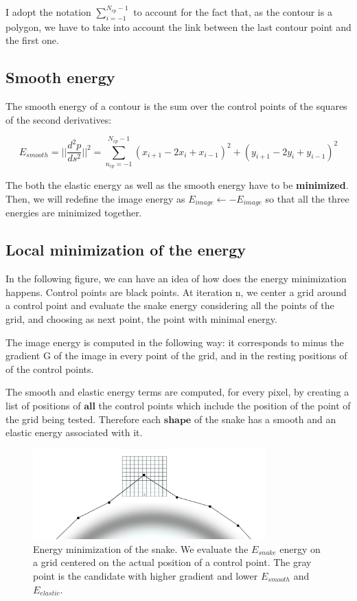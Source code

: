 \documentclass[24pt]{article}
\begin{document}
I adopt the notation $\sum_{i = -1}^{N_{cp}-1} $ to account for the fact that, as the contour is a polygon, we have to take into account the link between the last contour point and the first one. 

\subsection{Smooth energy} 

 The smooth energy of a contour is the sum over the control points of the squares of the second derivatives:
   
   $$E_{smooth} = || \frac{d^2p}{ds^2}||^2  = \sum_{n_{cp} = -1}^{N_{cp}-1} (x_{i+1} - 2 x_{i} + x_{i-1})^2 + (y_{i+1} - 2 y_{i} + y_{i-1})^2   $$   

The both the elastic energy as well as the smooth energy have to be \textbf{minimized}. Then, we will redefine the image energy as $E_{image} \leftarrow -E_{image}$ so that all the three energies are minimized together. 

\subsection{Local minimization of the energy} 

In the following figure, we can have an idea of how does the energy minimization happens. Control points are black points. At iteration n, we center a grid around a control point and evaluate the snake energy considering all the points of the grid, and choosing as next point, the point with minimal energy. 


The image energy is computed in the following way: it corresponds to minus the gradient G of the image in every point of the grid, and in  the resting positions of of the control points. 

The smooth and elastic energy terms are computed, for every pixel, by creating a list of positions of $\textbf{all}$ the control points which include the position of the point of the grid being tested. Therefore each $\textbf{shape}$ of the snake has a smooth and an elastic energy associated with it.  
 


\begin{figure}[h!]
  \centering
  \includegraphics[width=0.8\textwidth]{minimisation.pdf}
  \caption{Energy minimization of the snake. We evaluate the $E_{snake}$ energy on a grid centered on the actual position of a control point. The gray point is the candidate with higher gradient and lower $E_{smooth}$  and $E_{elastic}$.}
  \label{fig:en_min}
\end{figure}
\end{document}
